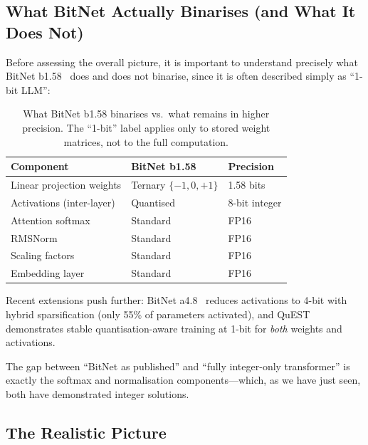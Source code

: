 \subsection{What BitNet Actually Binarises (and What It Does Not)}
\label{sec:bitnet-reality}

Before assessing the overall picture, it is important to understand
precisely what BitNet b1.58~\cite{ma2024bitnet} does and does not
binarise, since it is often described simply as ``1-bit LLM'':

\begin{table}[htbp]
\centering
\caption{What BitNet b1.58 binarises vs.\ what remains in higher
  precision. The ``1-bit'' label applies only to stored weight
  matrices, not to the full computation.}
\label{tab:bitnet-reality}
\begin{tabular}{@{}lll@{}}
  \toprule
  \textbf{Component} & \textbf{BitNet b1.58} & \textbf{Precision} \\
  \midrule
  Linear projection weights & Ternary $\{-1,0,+1\}$ & 1.58 bits \\
  Activations (inter-layer) & Quantised & 8-bit integer \\
  Attention softmax & Standard & FP16 \\
  RMSNorm & Standard & FP16 \\
  Scaling factors & Standard & FP16 \\
  Embedding layer & Standard & FP16 \\
  \bottomrule
\end{tabular}
\end{table}

Recent extensions push further: BitNet
a4.8~\cite{wang2024bitneta48} reduces activations to 4-bit with
hybrid sparsification (only 55\% of parameters activated), and
QuEST~\cite{panferov2025quest} demonstrates stable
quantisation-aware training at 1-bit for \emph{both} weights and
activations.

The gap between ``BitNet as published'' and ``fully integer-only
transformer'' is exactly the softmax and normalisation components---which,
as we have just seen, both have demonstrated integer solutions.

\subsection{The Realistic Picture}
\label{sec:realistic-picture}

